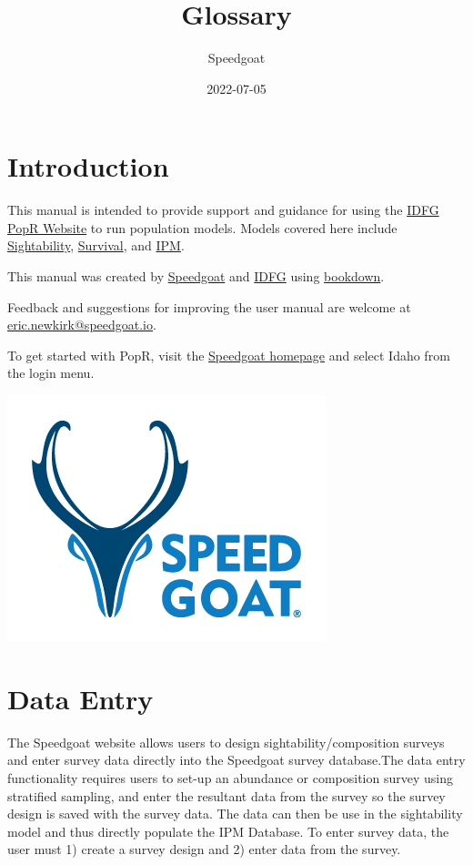 \documentclass[
]{book}
\title{Glossary}
\author{Speedgoat}
\date{2022-07-05}
\begin{document}
\maketitle

{
\setcounter{tocdepth}{1}
\tableofcontents
}
\hypertarget{introduction}{%
\chapter{Introduction}\label{introduction}}

This manual is intended to provide support and guidance for using the
\href{https://popr.cfc.umt.edu/IDFG/}{IDFG PopR Website} to run population models. Models covered here include
\protect\hyperlink{sight}{Sightability}, \protect\hyperlink{surv}{Survival}, and \protect\hyperlink{ipm}{IPM}.

This manual was created by \href{https://www.speedgoat.io}{Speedgoat} and \href{https://idfg.idaho.gov/}{IDFG} using \href{https://bookdown.org/}{bookdown}.

Feedback and suggestions for improving the user manual are welcome at \href{mailto:eric.newkirk@speedgoat.io?cc=josh.nowak@speedgoat.io\&subject=PopR\%20Documentation\%20Feedback}{eric.newkirk@speedgoat.io}.

To get started with PopR, visit the \href{https://www.speedgoat.io/}{Speedgoat homepage} and select Idaho from the login menu.

\href{https://www.speedgoat.io}{\includegraphics{./www/spdgt_logo.png}}

\hypertarget{dataentry}{%
\chapter{Data Entry}\label{dataentry}}

The Speedgoat website allows users to design sightability/composition surveys and enter survey data directly into the Speedgoat survey database.The data entry functionality requires users to set-up an abundance or composition survey using stratified sampling, and enter the resultant data from the survey so the survey design is saved with the survey data. The data can then be use in the sightability model and thus directly populate the IPM Database. To enter survey data, the user must 1) create a survey design and 2) enter data from the survey.
\end{document}
